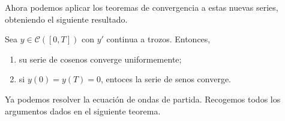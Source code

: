 \documentclass{article}
\begin{document}
Ahora podemos aplicar los teoremas de convergencia a estas nuevas series, obteniendo el siguiente
resultado.

\begin{theorem}
  \label{thm:fourier:convergencia:2}
  Sea $y \in \mathcal{C}([0, T])$ con $y'$ continua a trozos. Entonces,
  
  \begin{enumerate}
  \item su serie de cosenos converge uniformemente;
  \item si $y(0) = y(T) = 0$, entoces la serie de senos converge.
  \end{enumerate}
\end{theorem}

Ya podemos resolver la ecuación de ondas de partida. Recogemos todos los argumentos dados en el
siguiente teorema.
\end{document}

